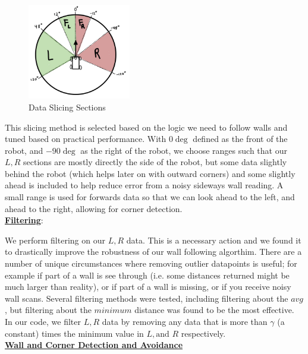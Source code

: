 \documentclass{article}
\begin{document}
\begin{figure}[h]
\begin{center}
\includegraphics[width=0.4\textwidth]{Splicing.png} %
\caption{Data Slicing Sections}
\end{center}
\label{workflow}
\end{figure}

This slicing method is selected based on the logic we need to follow walls and tuned based on practical performance. With $0\deg$ defined as the front of the robot, and $-90\deg$ as the right of the robot, we choose ranges such that our $L,R$ sections are mostly directly the side of the robot, but some data slightly behind the robot (which helps later on with outward corners) and some slightly ahead is included to help reduce error from a noisy sideways wall reading. A small range is used for forwards data so that we can look ahead to the left, and ahead to the right, allowing for corner detection.\\

\textbf{\underline{Filtering}}: 

We perform filtering on our $L,R$ data. This is a necessary action and we found it to drastically improve the robustness of our wall following algorthim. There are a number of unique circumstances where removing outlier datapoints is useful; for example if part of a wall is see through (i.e. some distances returned might be much larger than reality), or if part of a wall is missing, or if you receive noisy wall scans. Several filtering methods were tested, including filtering about the $avg$, but filtering about the $minimum$ distance was found to be the most effective. In our code, we filter $L,R$ data by removing any data that is more than $\gamma$ (a constant) times the minimum value in $L,\textrm{and }R$ respectively.\\

\textbf{\underline{Wall and Corner Detection and Avoidance}}
\end{document}
